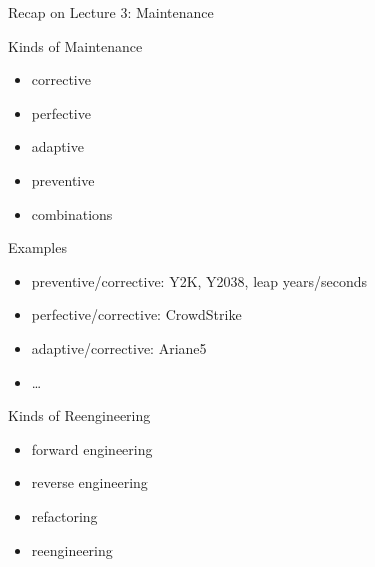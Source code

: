 \begin{frame}{Recap on Lecture 3: Maintenance}
	\begin{fancycolumns}
		\begin{note}{Kinds of Maintenance}
			\begin{itemize}
				\item corrective
				\item perfective
				\item adaptive
				\item preventive
				\item combinations
			\end{itemize}
		\end{note}
		\begin{example}{Examples}
			\begin{itemize}
				\item preventive/corrective: Y2K, Y2038, leap years/seconds
				\item perfective/corrective: CrowdStrike
				\item adaptive/corrective: Ariane5
				\item \ldots{}
			\end{itemize}
		\end{example}
		\nextcolumn
		\begin{note}{Kinds of Reengineering}
			\begin{itemize}
				\item forward engineering
				\item reverse engineering
				\item refactoring
				\item reengineering
			\end{itemize}
		\end{note}
	\end{fancycolumns}
\end{frame}

